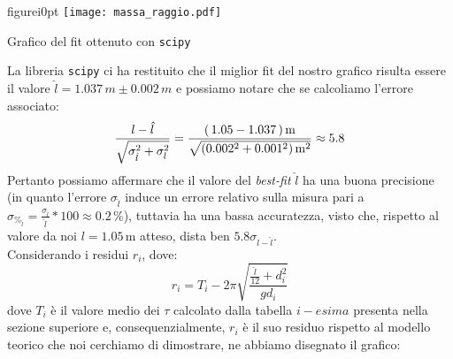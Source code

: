 \documentclass{article}
\begin{document}
\begin{wrapfloat}{figure}{i}{0pt}
	\texttt{[image: massa\_raggio.pdf]}
	\caption{Grafico del fit ottenuto con \texttt{scipy}}
\end{wrapfloat}
La libreria \texttt{scipy} ci ha restituito che il miglior fit del nostro grafico risulta essere il valore $\hat{l} = 1.037 \, m \pm 0.002 \, m$ e possiamo notare che se calcoliamo l'errore associato:
$$
	\frac{l - \hat{l}}{\sqrt{\sigma^2_{\hat{l}} + \sigma^2_{l}}} = \\ \frac{(\, 1.05 - 1.037 \, ) \, \text{m}}{\sqrt{(0.002^2 + 0.001^2) \, \text{m}^2}} \approx \\ 5.8
$$
Pertanto possiamo affermare che il valore del \emph{best-fit} $\hat{l}$ ha una buona precisione (in quanto l'errore $\sigma_{\hat{l}}$ induce un errore relativo sulla misura pari a $\sigma_{\%_{\hat{l}}} = \frac{\sigma_{\hat{l}}}{\hat{l}} * 100 \approx 0.2 \, \% $), tuttavia ha una bassa accuratezza, visto che, rispetto al valore da noi $l=1.05 \, \text{m}$ atteso, dista ben $5.8\sigma_{l-\hat{l}}$. \\
Considerando i residui $r_{i}$, dove:
\begin{equation}
	r_i = T_i - 2\pi\sqrt{\frac{\frac{\hat{l}}{12} + d_i^2}{gd_i}}
\end{equation}
dove $T_i$ è il valore medio dei $\tau$ calcolato dalla tabella $i-esima$ presenta nella sezione superiore e, consequenzialmente, $r_i$ è il suo residuo rispetto al modello teorico che noi cerchiamo di dimostrare, ne abbiamo disegnato il grafico: 
\end{document}
